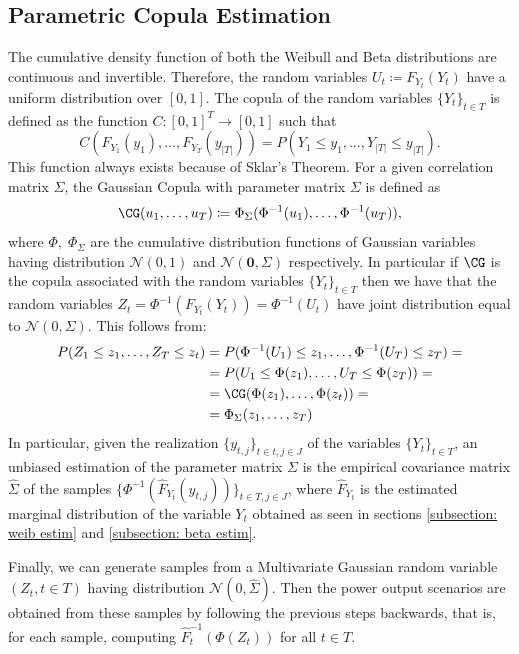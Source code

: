 \documentclass[smallextended,natbib]{svjour3}       %
\numberwithin{theorem}{section}
\begin{document}
\subsection{Parametric Copula Estimation}
The cumulative density function of both the Weibull and Beta distributions are continuous and invertible. 
Therefore, the random variables \( U_t \coloneqq F_{Y_t}(Y_t) \) have a uniform distribution over \([0,1]\). 
The copula of the random variables \(\{Y_t\}_{t \in T}\) is defined as the function \(C: [0,1]^T \to [0,1]\) such that 
\begin{equation}
C(F_{Y_1}(y_1), \ldots, F_{Y_T}(y_{|T|})) = P(Y_1 \leq y_1, \ldots, Y_{|T|} \leq y_{|T|}).
\end{equation}
This function always exists because of Sklar's Theorem. 
For a given correlation matrix \(\Sigma\), the Gaussian Copula with parameter matrix \(\Sigma\) is defined as 
\[\CG(u_1,\ldots,u_{T}) \coloneqq \Phi_{\Sigma}(\Phi^{-1}(u_1),\ldots, \Phi^{-1}(u_T)),\] 
where \(\Phi,\; \Phi_{\Sigma}\) are the cumulative distribution functions of Gaussian variables having distribution \(\mathcal{N}(0,1)\) and \( \mathcal{N}(\mathbf{0},\Sigma)\) respectively. 
In particular if \(\CG\) is the copula associated with the random variables \(\{Y_t\}_{t \in T}\) then we have that the random variables \(Z_t = \Phi^{-1}(F_{Y_t}(Y_t)) = \Phi^{-1}(U_t)\) have joint distribution equal to \(\mathcal{N}(0, \Sigma)\). 
This follows from:
\begin{align*}
P(Z_1 \leq z_1, \ldots, Z_T \leq z_t) &= P(\Phi^{-1}(U_1) \leq z_1, \ldots, \Phi^{-1}(U_T) \leq z_T) = \\
&= P(U_1 \leq \Phi(z_1), \ldots, U_T \leq \Phi(z_T)) = \\
&= \CG(\Phi(z_1), \ldots, \Phi(z_t)) =  \\
&= \Phi_{\Sigma}(z_1, \ldots, z_T)
\end{align*}
In particular, given the realization \(\{y_{t,j}\}_{t \in t, j \in J}\) of the variables \(\{Y_t\}_{t \in T}\), an unbiased estimation of the parameter matrix \(\Sigma\) is the empirical covariance matrix \(\hat \Sigma\) of the samples \(\{\Phi^{-1}(\hat{F}_{Y_t}(y_{t,j}))\}_{t\in T, j \in J}\), where \(\hat{F}_{Y_t}\) is the estimated marginal distribution of the variable \(Y_t\) obtained as seen in sections \ref{subsection: weib estim} and \ref{subsection: beta estim}.

Finally, we can generate samples from a Multivariate Gaussian random variable \((Z_{t}, t \in T)\) having distribution \(\mathcal{N}(0, \hat \Sigma)\).
Then the power output scenarios are obtained from these samples by following the previous steps backwards, that is, for each sample, computing \(\hat F_{t}^{-1}(\Phi(Z_{t}))\) for all \(t\in T\). 
\end{document}
